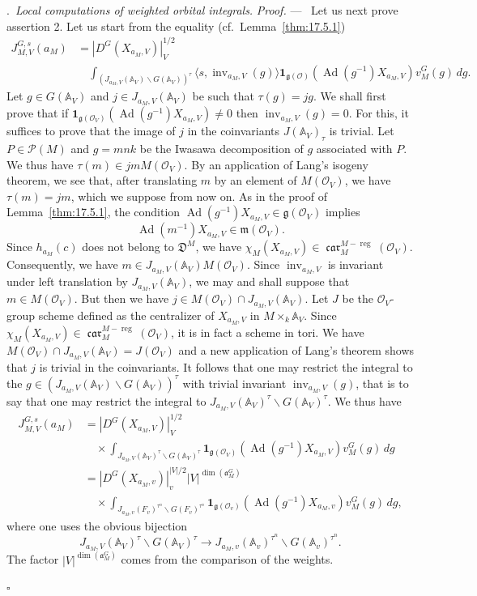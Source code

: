 \documentclass[12pt,a4paper,oneside,english,leqno]{smfart}
\makeatletter
\numberwithin{equation}{subsection}
\newcounter{theo}
\numberwithin{theo}{subsection}
\newenvironment{paragr}[1][]{\medskip\refstepcounter{subsection}%
  \par\noindent\hspace*{\parindent}\thesubsection.\ \emph{#1}%
  \@ifundefined{@empty}{}{}\ignorespaces}{\medskip}
\theoremstyle{plain}
\theoremstyle{definition}
\theoremstyle{remark}
\newenvironment{preuve}[1][]{\medskip\noindent\textit{Proof.} #1 ---\ }%
  {\hfill\ensuremath{\square}\medskip}
\DeclareMathOperator{\reg}{reg}
\DeclareMathOperator{\Ad}{Ad}
\DeclareMathOperator{\inv}{inv}
\DeclareMathOperator{\car}{\mathfrak{car}}
\newcommand{\AAA}{\mathbb{A}}
\newcommand{\oc}{\mathcal{O}}
\newcommand{\pc}{\mathcal{P}}
\newcommand{\ggo}{\mathfrak{g}}
\newcommand{\mgo}{\mathfrak{m}}
\newcommand{\ago}{\mathfrak{a}}
\newcommand{\back}{\backslash}
\newcommand{\bg}{\langle}
\newcommand{\bd}{\rangle}
\makeatother
\begin{document}
\begin{paragr}[Local computations of weighted orbital integrals.]
\begin{preuve}
Let us next prove assertion 2. Let us start from the equality (cf.\ Lemma~\ref{thm:17.5.1})
\[
\begin{aligned}
J^{G,s}_{M,V}(a_M)&=|D^G(X_{a_M,V})|_V^{1/2}\\
&\quad\int_{(J_{a_M,V}(\AAA_V)\back G(\AAA_V))^\tau}
\bg s,\inv_{a_M,V}(g)\bd\mathbf{1}_{\ggo(\oc)}(\Ad(g^{-1})X_{a_M,V})
v^G_M(g)\,dg.
\end{aligned}
\]
Let $g\in G(\AAA_V)$ and $j\in J_{a_M,V}(\AAA_V)$ be such that $\tau(g)=jg$. We shall first prove that if $\mathbf{1}_{\ggo(\oc_V)}(\Ad(g^{-1})X_{a_M,V})\neq 0$ then $\inv_{a_M,V}(g)=0$. For this, it suffices to prove that the image of $j$ in the coinvariants $J(\AAA_V)_\tau$ is trivial. Let $P\in\pc(M)$ and $g=mnk$ be the Iwasawa decomposition of $g$ associated with $P$. We thus have $\tau(m)\in jmM(\oc_V)$. By an application of Lang's isogeny theorem, we see that, after translating $m$ by an element of $M(\oc_V)$, we have $\tau(m)=jm$, which we suppose from now on. As in the proof of Lemma~\ref{thm:17.5.1}, the condition $\Ad(g^{-1})X_{a_M,V}\in\ggo(\oc_V)$ implies
$$
\Ad(m^{-1})X_{a_M,V}\in\mgo(\oc_V).
$$
Since $h_{a_M}(c)$ does not belong to $\mathfrak{D}^M$, we have $\chi_M(X_{a_M,V})\in\car_M^{M-\reg}(\oc_V)$. Consequently, we have $m\in J_{a_M,V}(\AAA_V)M(\oc_V)$. Since $\inv_{a_M,V}$ is invariant under left translation by $J_{a_M,V}(\AAA_V)$, we may and shall suppose that $m\in M(\oc_V)$. But then we have $j\in M(\oc_V)\cap J_{a_M,V}(\AAA_V)$. Let $J$ be the $\oc_V$-group scheme defined as the centralizer of $X_{a_M,V}$ in $M\times_k\AAA_V$. Since $\chi_M(X_{a_M,V})\in\car_M^{M-\reg}(\oc_V)$, it is in fact a scheme in tori. We have $M(\oc_V)\cap J_{a_M,V}(\AAA_V)=J(\oc_V)$ and a new application of Lang's theorem shows that $j$ is trivial in the coinvariants. It follows that one may restrict the integral to the $g\in(J_{a_M,V}(\AAA_V)\back G(\AAA_V))^\tau$ with trivial invariant $\inv_{a_M,V}(g)$, that is to say that one may restrict the integral to $J_{a_M,V}(\AAA_V)^\tau\back G(\AAA_V)^\tau$. We thus have
\[
\begin{aligned}
J^{G,s}_{M,V}(a_M)&=|D^G(X_{a_M,V})|_V^{1/2}\\
&\quad\times\int_{J_{a_M,V}(\AAA_V)^\tau\back G(\AAA_V)^\tau}
\mathbf{1}_{\ggo(\oc_V)}(\Ad(g^{-1})X_{a_M,V})v^G_M(g)\,dg\\
&=|D^G(X_{a_M,v})|_v^{|V|/2}|V|^{\dim(\ago^G_M)}\\
&\quad\times\int_{J_{a_M,v}(F_v)^{\tau^n}\back G(F_v)^{\tau^n}}
\mathbf{1}_{\ggo(\oc_v)}(\Ad(g^{-1})X_{a_M,v})v^G_M(g)\,dg,
\end{aligned}
\]
where one uses the obvious bijection
$$
J_{a_M,V}(\AAA_V)^\tau\back G(\AAA_V)^\tau\to J_{a_M,v}(\AAA_v)^{\tau^n}\back G(\AAA_v)^{\tau^n}.
$$
The factor $|V|^{\dim(\ago^G_M)}$ comes from the comparison of the weights.


\end{preuve}
\end{paragr}
\end{document}
